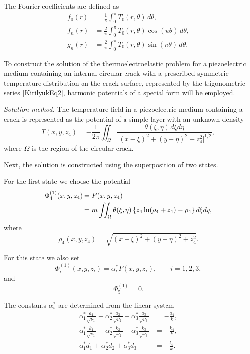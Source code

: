 The Fourier coefficients are defined as
\begin{equation*}
	\begin{aligned}
		f_{0}(r) &= \frac{1}{\pi}\int_{0}^{\pi} T_{0}(r,\theta)\, d\theta, \\
		f_{n}(r) &= \frac{2}{\pi}\int_{0}^{\pi} T_{0}(r,\theta)\cos(n\theta)\, d\theta, \\
		g_{n}(r) &= \frac{2}{\pi}\int_{0}^{\pi} T_{0}(r,\theta)\sin(n\theta)\, d\theta .
	\end{aligned}
\end{equation*}

To construct the solution of the thermoelectroelastic problem for a piezoelectric medium containing an internal circular crack with a prescribed symmetric temperature distribution on the crack surface, represented by the trigonometric series \eqref{KirilyukEq2}, harmonic potentials of a special form will be employed.


\medskip
\emph{Solution method.}
The temperature field in a piezoelectric medium containing a crack is represented as the potential of a simple layer with an unknown density
\begin{equation}
	T(x,y,z_4) =
	-\frac{1}{2\pi}
	\iint_{\Omega}
	\frac{\theta(\xi,\eta)\, d\xi d\eta}
	{\big[(x-\xi)^2+(y-\eta)^2+z_4^2\big]^{1/2}},
	\label{KirilyukEq13}
\end{equation}
where $\Omega$ is the region of the circular crack.

Next, the solution is constructed using the superposition of two states.

For the first state we choose the potential
\begin{align}
	\Phi_4^{(1)}(x,y,z_4)&=F(x,y,z_4)
	\notag
	\\
	&=
	m
	\iint_{\Omega}
	\theta(\xi,\eta)
	\left\{
	z_4 \ln(\rho_4+z_4)-\rho_4
	\right\}
	d\xi d\eta ,
	\label{KirilyukEq14}
\end{align}
where
\[
\rho_4(x,y,z_4)
=
\sqrt{(x-\xi)^2+(y-\eta)^2+z_4^2}.
\]

For this state we also set
\[
\Phi_i^{(1)}(x,y,z_i)
=
\alpha_i^{*}F(x,y,z_i),
\qquad i=1,2,3,
\]
and
\[
\Phi_5^{(1)}=0 .
\]

The constants $\alpha_i^{*}$ are determined from the linear system
\begin{align}
	\alpha_1^{*}\frac{a_1}{\sqrt{\nu_1}}
	+
	\alpha_2^{*}\frac{a_2}{\sqrt{\nu_2}}
	+
	\alpha_3^{*}\frac{a_3}{\sqrt{\nu_3}}
	&=
	-\frac{a_4}{k},
	\nonumber\\
	\alpha_1^{*}\frac{k_1}{\sqrt{\nu_1}}
	+
	\alpha_2^{*}\frac{k_2}{\sqrt{\nu_2}}
	+
	\alpha_3^{*}\frac{k_3}{\sqrt{\nu_3}}
	&=
	-\frac{k_4}{k},
	\label{KirilyukEq15}\\
	\alpha_1^{*} d_1
	+
	\alpha_2^{*} d_2
	+
	\alpha_3^{*} d_3
	&=
	-\frac{l_4}{k}.
	\nonumber
\end{align}

